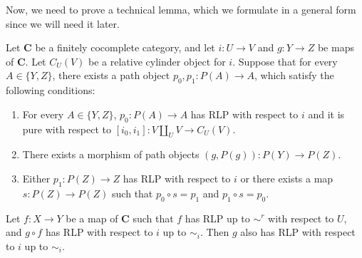 \documentclass[reqno]{amsart}
\theoremstyle{definition}
\newcommand{\cat}[1]{\mathbf{#1}}
\newcommand{\C}{\cat{C}}
\newcommand{\cyli}{i}
\begin{document}
Now, we need to prove a technical lemma, which we formulate in a general form since we will need it later.

\begin{lem}[we-bot]
Let $\C$ be a finitely cocomplete category, and let $i : U \to V$ and $g : Y \to Z$ be maps of $\C$.
Let $C_U(V)$ be a relative cylinder object for $i$.
Suppose that for every $A \in \{ Y, Z \}$, there exists a path object $p_0,p_1 : P(A) \to A$, which satisfy the following conditions:
\begin{enumerate}
\item For every $A \in \{ Y, Z \}$, $p_0 : P(A) \to A$ has RLP with respect to $i$ and it is pure with respect to $[\cyli_0,\cyli_1] : V \amalg_U V \to C_U(V)$.
\item There exists a morphism of path objects $(g,P(g)) : P(Y) \to P(Z)$.
\item Either $p_1 : P(Z) \to Z$ has RLP with respect to $i$ or there exists a map $s : P(Z) \to P(Z)$ such that $p_0 \circ s = p_1$ and $p_1 \circ s = p_0$.
\end{enumerate}

Let $f : X \to Y$ be a map of $\C$ such that $f$ has RLP up to $\sim^r$ with respect to $U$, and $g \circ f$ has RLP with respect to $i$ up to $\sim_i$.
Then $g$ also has RLP with respect to $i$ up to $\sim_i$.
\end{lem}
\end{document}

